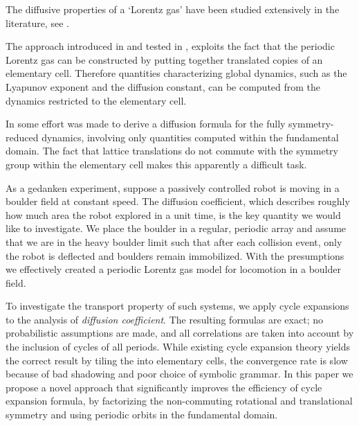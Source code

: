 
The diffusive properties of a `Lorentz gas'
have been studied extensively in the literature,
see .

The approach introduced in  and tested in
, exploits the fact that the periodic Lorentz gas can be
constructed by putting together translated copies of an elementary cell.
Therefore quantities characterizing global dynamics, such as the Lyapunov
exponent and the diffusion constant, can be computed from the dynamics
restricted to the elementary cell.

In  some effort was made to derive a diffusion
formula for the fully symmetry-reduced dynamics, involving only
quantities computed within the fundamental domain. The fact that lattice
translations do not commute with the symmetry group within the elementary
cell makes this apparently a difficult task.

As a gedanken experiment, suppose a passively controlled robot is moving
in a boulder field at constant speed. The diffusion coefficient, which
describes roughly how much area the robot explored in a unit time, is the
key quantity we would like to investigate. We place the boulder in a
regular, periodic array and assume that we are in the heavy boulder limit
such that after each collision event, only the robot is deflected and
boulders remain immobilized. With the presumptions we effectively created
a periodic Lorentz gas model for locomotion in a boulder
field.

To investigate the transport property of such systems, we apply cycle
expansions to the analysis of {\em diffusion coefficient}.
The resulting formulas are exact; no probabilistic assumptions are made,
and all correlations are taken into account by the  inclusion of cycles
of all periods. While existing cycle expansion theory yields the correct
result by tiling the {\statesp} into elementary cells, the convergence
rate is slow because of bad shadowing and poor choice of symbolic
grammar. In this paper we propose a novel approach that
significantly improves the efficiency of cycle expansion formula, by
factorizing the non-commuting rotational and translational symmetry and
using periodic orbits in the fundamental domain.



